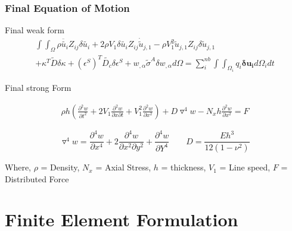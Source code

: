 \documentclass[9pt]{beamer}
\begin{document}
\begin{frame}
\frametitle{Final Equation of Motion}
\begin{block}{Final weak form}
\begin{equation*}
\begin{split}
 \int \int_\Omega 
\rho \ddot{\tilde{u_i}} Z_{ij} \delta {\tilde{u_i}}
+
2 \rho V_1 \delta {\tilde{u_i}} Z_{ij} \dot{\tilde{u}}_{j,1} 
-
\rho V_1^2 \tilde{u}_{j,1} Z_{ij} \delta \tilde{u}_{j,1}
\\ 
+
\kappa^T \tilde{D} \delta\kappa 
+
\left(\epsilon^S\right)^T \tilde{D_c} \delta\epsilon^S 
+ 
 w_{, \alpha} \tilde{\sigma}^A  \delta w_{, \alpha} d \Omega     
=  
 \sum_i^{nb}   \int  \int_{\Omega_i} q_i \mathbf{\delta u_i}  d \Omega_i dt
\end{split} 
\end{equation*}

\end{block}

\begin{block}{Final strong Form}

\begin{equation*}
\begin{split}
\rho h \left( \frac{\partial ^ 2 w}{\partial t ^ 2 }+2V_1\frac{\partial ^ 2 w}{\partial x \partial t} + V_1^2
\frac{\partial ^ 2 w}{\partial x ^ 2 } \right)  + D  \triangledown ^4 w - N_xh\frac{\partial ^ 2 w}{\partial x ^ 2 }=F 
\end{split} 
\end{equation*}


\end{block}
\begin{equation*}
\triangledown ^4 w = \frac{\partial ^ 4 w}{\partial x ^ 4 }+2 \frac{\partial ^ 4 w}{\partial x ^ 2 \partial y ^ 2 } + \frac{\partial ^ 4 w}{\partial Y ^ 4 } \qquad D = \frac{Eh^3}{12 \left( 1 - \nu^2 \right) }
\end{equation*}

Where, $\rho$ = Density, $N_x$ = Axial Stress, $h$ = thickness, $V_1$ = Line speed, $F$ = Distributed Force
\end{frame}

\section{Finite Element Formulation}
\end{document}
